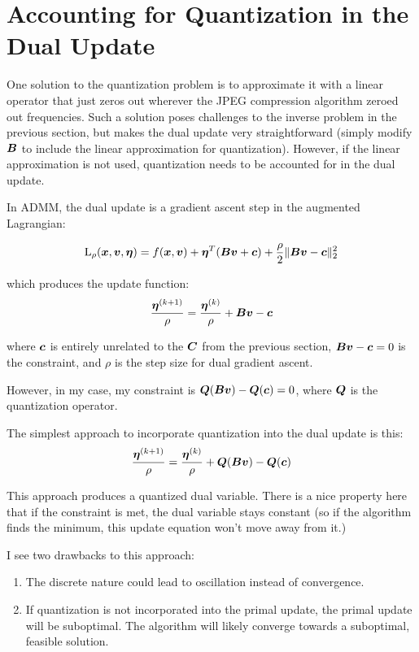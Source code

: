 \documentclass{article}
\begin{document}
\section{Accounting for Quantization in the Dual Update}
One solution to the quantization problem is to approximate it with a linear operator that just zeros out wherever the JPEG compression algorithm zeroed out frequencies. Such a solution poses challenges to the inverse problem in the previous section, but makes the dual update very straightforward (simply modify $\bm{B}$ to include the linear approximation for quantization). However, if the linear approximation is not used, quantization needs to be accounted for in the dual update.

In ADMM, the dual update is a gradient ascent step in the augmented Lagrangian:

\begin{equation}
\operatorname{L}_{\rho}(\bm{x},\bm{v},\bm{\eta}) = f(\bm{x},\bm{v}) + \bm{\eta}^T(\bm{B}\bm{v} + \bm{c}) + \frac{\rho}{2}\|\bm{B}\bm{v} - \bm{c}\|_2^2
\end{equation}

which produces the update function:
\begin{equation}
\frac{\bm{\eta}^{(k + 1)}}{\rho} = \frac{\bm{\eta}^{(k)}}{\rho} + \bm{B}\bm{v} - \bm{c}
\end{equation}

where $\bm{c}$ is entirely unrelated to the $\bm{C}$ from the previous section, $\bm{B}\bm{v} - \bm{c} = 0$ is the constraint, and $\rho$ is the step size for dual gradient ascent.


However, in my case, my constraint is $\bm{Q}(\bm{B}\bm{v}) - \bm{Q}(\bm{c}) = 0$, where $\bm{Q}$ is the quantization operator.


The simplest approach to incorporate quantization into the dual update is this:
\begin{equation}
\frac{\bm{\eta}^{(k + 1)}}{\rho} = \frac{\bm{\eta}^{(k)}}{\rho} + \bm{Q}(\bm{B}\bm{v}) - \bm{Q}(\bm{c})
\end{equation}

This approach produces a quantized dual variable. There is a nice property here that if the constraint is met, the dual variable stays constant (so if the algorithm finds the minimum, this update equation won't move away from it.)

I see two drawbacks to this approach:
\begin{enumerate}
\item
The discrete nature could lead to oscillation instead of convergence.
\item
If quantization is not incorporated into the primal update, the primal update will be suboptimal. The algorithm will likely converge towards a suboptimal, feasible solution.
\end{enumerate}
\end{document}
